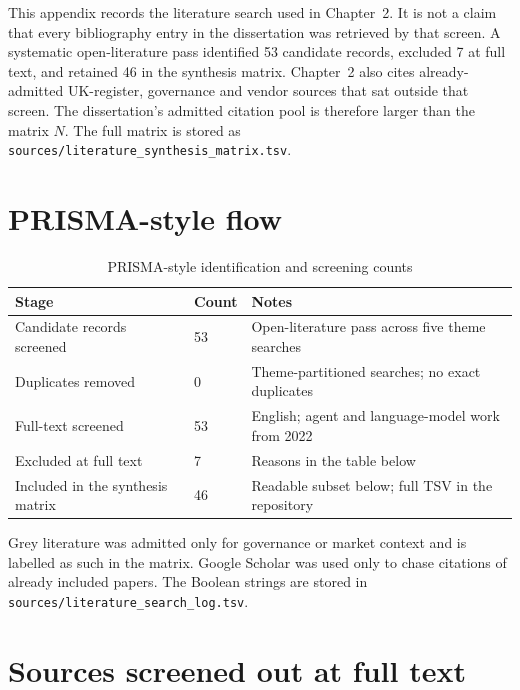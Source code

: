 This appendix records the literature search used in Chapter~2. It is not a claim that every
bibliography entry in the dissertation was retrieved by that screen. A systematic open-literature
pass identified 53 candidate records, excluded 7 at full text, and retained 46 in the synthesis
matrix. Chapter~2 also cites already-admitted UK-register, governance and vendor sources that sat
outside that screen. The dissertation's admitted citation pool is therefore larger than the matrix
$N$. The full matrix is stored as \texttt{sources/literature\_synthesis\_matrix.tsv}.

\section*{PRISMA-style flow}

\begin{table}[htbp]
  \centering
  \small
  \begin{tabularx}{\textwidth}{@{}P{0.38\textwidth}P{0.12\textwidth}Y@{}}
    \toprule
    \textbf{Stage} & \textbf{Count} & \textbf{Notes} \\
    \midrule
    Candidate records screened & 53 & Open-literature pass across five theme searches \\
    Duplicates removed & 0 & Theme-partitioned searches; no exact duplicates \\
    Full-text screened & 53 & English; agent and language-model work from 2022 \\
    Excluded at full text & 7 & Reasons in the table below \\
    Included in the synthesis matrix & 46 & Readable subset below; full TSV in the repository \\
    \bottomrule
  \end{tabularx}
  \caption{PRISMA-style identification and screening counts}
  \label{tab:lit-prisma-flow}
\end{table}

Grey literature was admitted only for governance or market context and is labelled as such in the
matrix. Google Scholar was used only to chase citations of already included papers. The Boolean
strings are stored in \texttt{sources/literature\_search\_log.tsv}.

\section*{Sources screened out at full text}

